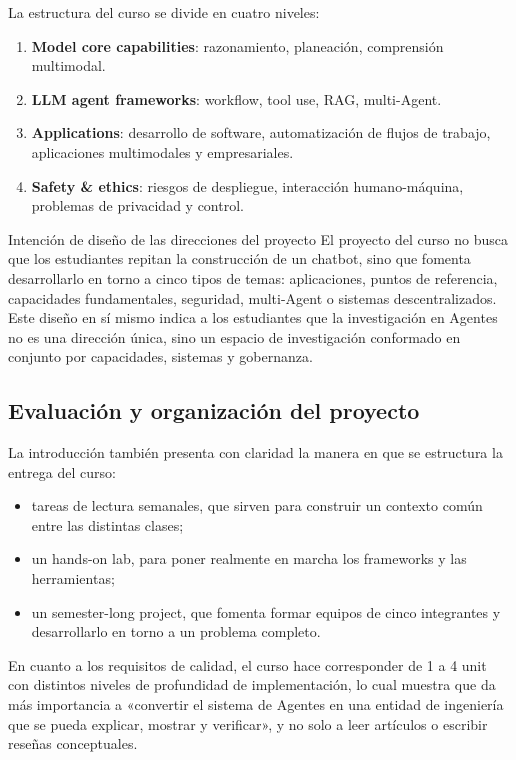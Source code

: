 \documentclass[a4paper]{article}
\begin{document}
La estructura del curso se divide en cuatro niveles:
\begin{enumerate}
    \item \textbf{Model core capabilities}: razonamiento, planeación, comprensión multimodal.
    \item \textbf{LLM agent frameworks}: workflow, tool use, RAG, multi-Agent.
    \item \textbf{Applications}: desarrollo de software, automatización de flujos de trabajo, aplicaciones multimodales y empresariales.
    \item \textbf{Safety \& ethics}: riesgos de despliegue, interacción humano-máquina, problemas de privacidad y control.
\end{enumerate}

\begin{knowledgebox}{Intención de diseño de las direcciones del proyecto}
El proyecto del curso no busca que los estudiantes repitan la construcción de un chatbot, sino que fomenta desarrollarlo en torno a cinco tipos de temas: aplicaciones, puntos de referencia, capacidades fundamentales, seguridad, multi-Agent o sistemas descentralizados. Este diseño en sí mismo indica a los estudiantes que la investigación en Agentes no es una dirección única, sino un espacio de investigación conformado en conjunto por capacidades, sistemas y gobernanza.
\end{knowledgebox}

\subsection{Evaluación y organización del proyecto}

La introducción también presenta con claridad la manera en que se estructura la entrega del curso:
\begin{itemize}
    \item tareas de lectura semanales, que sirven para construir un contexto común entre las distintas clases;
    \item un hands-on lab, para poner realmente en marcha los frameworks y las herramientas;
    \item un semester-long project, que fomenta formar equipos de cinco integrantes y desarrollarlo en torno a un problema completo.
\end{itemize}

En cuanto a los requisitos de calidad, el curso hace corresponder de 1 a 4 unit con distintos niveles de profundidad de implementación, lo cual muestra que da más importancia a «convertir el sistema de Agentes en una entidad de ingeniería que se pueda explicar, mostrar y verificar», y no solo a leer artículos o escribir reseñas conceptuales.
\end{document}
